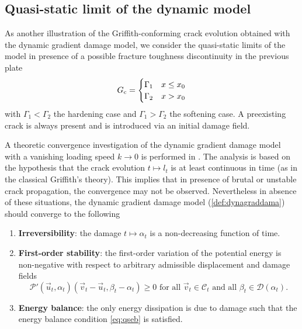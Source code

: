 \subsection{Quasi-static limit of the dynamic model}
As another illustration of the Griffith-conforming crack evolution obtained with the dynamic gradient damage model, we consider the quasi-static limits of the model in presence of a possible fracture toughness discontinuity in the previous plate
\[
G_\mathrm{c}=\begin{cases}
\Gamma_1 & x\leq x_0 \\
\Gamma_2 & x>x_0
\end{cases}
\]
with $\Gamma_1<\Gamma_2$ the hardening case and $\Gamma_1>\Gamma_2$ the softening case. A preexisting crack is always present and is introduced via an initial damage field.

A theoretic convergence investigation of the dynamic gradient damage model with a vanishing loading speed $k\to 0$ is performed in \cite{Versieux:2015}. The analysis is based on the hypothesis that the crack evolution $t\mapsto l_t$ is at least continuous in time (as in the classical Griffith's theory). This implies that in presence of brutal or unstable crack propagation, the convergence may not be observed. Nevertheless in absence of these situations, the dynamic gradient damage model (\cref{def:dynagraddama}) should converge to the following
\begin{definition} \label{def:firstorderqs} \noindent
\begin{enumerate}
\item \textbf{Irreversibility}: the damage $t\mapsto\alpha_t$ is a non-decreasing function of time.

\item \textbf{First-order stability}: the first-order variation of the potential energy is non-negative with respect to arbitrary admissible displacement and damage fields
\begin{equation} \label{eq:viqs}
\mathcal{P}'(\vec{u}_t,\alpha_t)(\vec{v}_t-\vec{u}_t,\beta_t-\alpha_t)\geq 0\text{ for all $\vec{v}_t\in\mathcal{C}_t$ and all $\beta_t\in\mathcal{D}(\alpha_t)$}.
\end{equation}

\item \textbf{Energy balance}: the only energy dissipation is due to damage such that the energy balance condition \eqref{eq:qseb} is satisfied.
\end{enumerate}
\end{definition}

